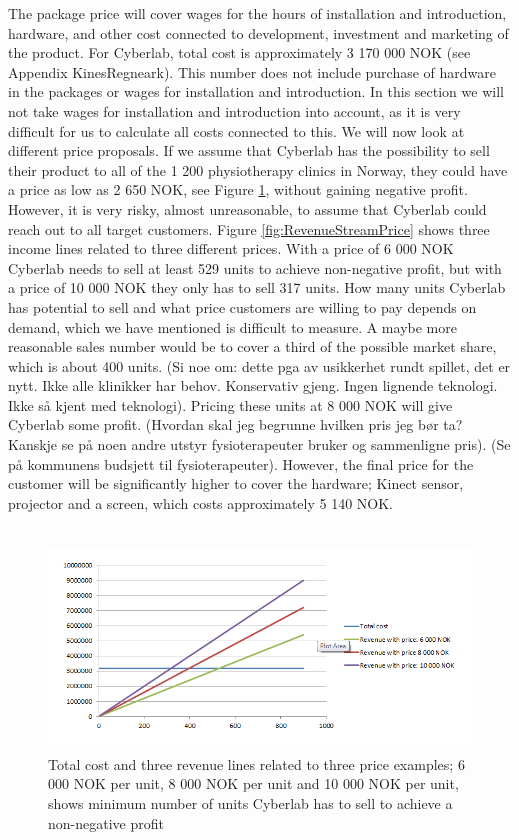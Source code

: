 The package price will cover wages for the hours of installation and introduction, hardware, and other cost connected to development, investment and marketing of the product. For Cyberlab, total cost is approximately 3 170 000 NOK (see Appendix KinesRegneark). This number does not include purchase of hardware in the packages or wages for installation and introduction. In this section we will not take wages for installation and introduction into account, as it is very difficult for us to calculate all costs connected to this. We will now look at different price proposals. If we assume that Cyberlab has the possibility to sell their product to all of the 1 200 physiotherapy clinics in Norway, they could have a price as low as 2 650 NOK, see Figure \ref{fig:RevenueStreamQuantity}, without gaining negative profit. However, it is very risky, almost unreasonable, to assume that Cyberlab could reach out to all target customers. Figure \ref{fig:RevenueStreamPrice} shows three income lines related to three different prices. With a price of 6 000 NOK Cyberlab needs to sell at least 529 units to achieve non-negative profit, but with a price of 10 000 NOK they only has to sell 317 units. How many units Cyberlab has potential to sell and what price customers are willing to pay depends on demand, which we have mentioned is difficult to measure. A maybe more reasonable sales number would be to cover a third of the possible market share, which is about 400 units. (Si noe om: dette pga av usikkerhet rundt spillet, det er nytt. Ikke alle klinikker har behov. Konservativ gjeng. Ingen lignende teknologi. Ikke s{å} kjent med teknologi). Pricing these units at 8 000 NOK will give Cyberlab some profit. (Hvordan skal jeg begrunne hvilken pris jeg b{ø}r ta? Kanskje se p{å} noen andre utstyr fysioterapeuter bruker og sammenligne pris). (Se p{å} kommunens budsjett til fysioterapeuter). However, the final price for the customer will be significantly higher to cover the hardware; Kinect sensor, projector and a screen, which costs approximately 5 140 NOK.\\ \\
\begin{figure}
\label{fig:RevenueStreamQuantity}
\begin{center}
\includegraphics[scale=0.7]{revenuestreamquantity}
\caption[Quantity examples]{Total cost and three revenue lines related to three price examples; 6 000 NOK per unit, 8 000 NOK per unit and 10 000 NOK per unit, shows minimum number of units Cyberlab has to sell to achieve a non-negative profit}
\end{center}
\end{figure}
